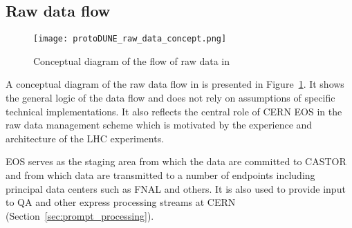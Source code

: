 \subsection{Raw data flow}
\label{sec:raw_concept}

\begin{figure}[tbh]
\centering\texttt{[image: protoDUNE\_raw\_data\_concept.png]}
\caption{\label{fig:raw_concept}Conceptual diagram of the flow of raw data in \pdsp}
\end{figure}


A conceptual diagram of the raw data flow in \pdsp is presented in Figure~\ref{fig:raw_concept}. It shows the general logic
of the data flow and does not rely on assumptions of specific technical implementations. 
It also reflects the central role of CERN EOS in the \pdsp raw data management scheme which is motivated by the experience
and architecture of the LHC experiments.

EOS serves as the staging area from which the data are committed to CASTOR
and from which data are transmitted to a number of endpoints including principal data centers such as FNAL and others.
It is also used to provide input to QA and other express processing streams at CERN (Section~\ref{sec:prompt_processing}).

